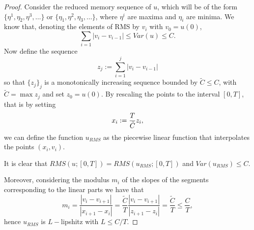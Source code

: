 \documentclass[10pt,a4paper]{amsart}
\begin{document}
\begin{proof}
    Consider the reduced memory sequence of $u$, which will be of the form $\{\eta^1,\eta_2,\eta^3,\dots\}$ or $\{\eta_1,\eta^2,\eta_3,\dots\}$, where $\eta^i$ are maxima and $\eta_i$ are minima. We know that, denoting the elements of RMS by $v_i$ with $v_0=u(0)$, \[\sum_{i=1} |v_{i}-v_{i-1}|\leq Var(u)\leq C.\]
    Now define the sequence \[z_j:= \sum_{i=1}^{j}|v_i-v_{i-1}|\] so that $\{z_j\}_j$ is a monotonically increasing sequence bounded by $\tilde{C}\leq C$, with $\tilde{C} = \max z_j$ and set $z_0=u(0).$ By rescaling the points to the interval $[0,T]$, that is by setting
    \[
    x_i:= \frac{T}{\Tilde{C}} z_i,
    \] 
    we can define the function $u_{RMS}$ as the piecewise linear function that interpolates the points $(x_i,v_i)$. \par 
    It is clear that $RMS(u;[0,T])=RMS(u_{RMS};[0,T])$ and $Var(u_{RMS})\leq C$. \par
    Moreover, considering the modulus $m_i$ of the slopes of the segments corresponding to the linear parts we have that
    \[m_i = \frac{|v_i-v_{i+1}|}{|x_{i+1}-x_i|} = \frac{\tilde{C}}{T} \frac{|v_i-v_{i+1}|}{|z_{i+1}-z_i|} = \frac{\tilde{C}}{T} \leq \frac{C}{T},\]
    hence $u_{RMS}$ is $L-$lipshitz with $L\leq C/T$.
\end{proof}
\end{document}
